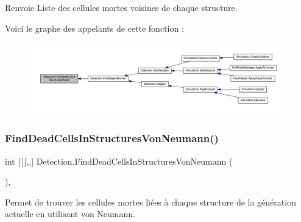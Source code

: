 \begin{DoxyReturn}{Renvoie}
Liste des cellules mortes voisines de chaque structure.
\end{DoxyReturn}
Voici le graphe des appelants de cette fonction \+:
\nopagebreak
\begin{figure}[H]
\begin{center}
\leavevmode
\includegraphics[width=350pt]{class_detection_a018511f85c3fb9eca82fc06c9f4eb031_icgraph}
\end{center}
\end{figure}
\mbox{\label{class_detection_aeea8bac4d15d3dd92d6b907b357c1680}} 
\subsubsection{\texorpdfstring{Find\+Dead\+Cells\+In\+Structures\+Von\+Neumann()}{FindDeadCellsInStructuresVonNeumann()}}
{\footnotesize\ttfamily int \mbox{[}$\,$\mbox{]}\mbox{[},,\mbox{]} Detection.\+Find\+Dead\+Cells\+In\+Structures\+Von\+Neumann (\begin{DoxyParamCaption}{ }\end{DoxyParamCaption})\hspace{0.3cm}{\ttfamily [inline]}, {\ttfamily [private]}}



Permet de trouver les cellules mortes liées à chaque structure de la génération actuelle en utilisant von Neumann. 

